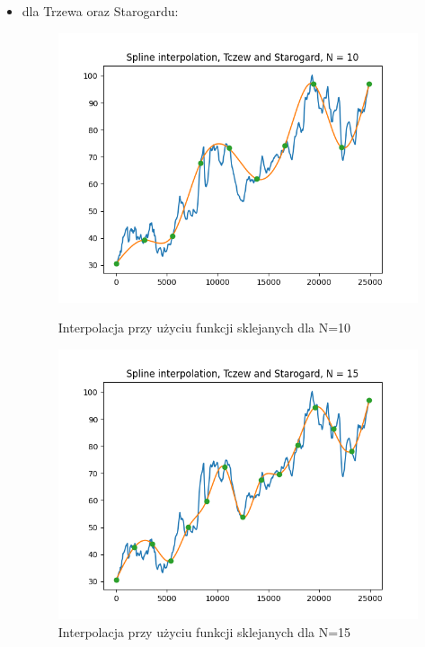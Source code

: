 \documentclass{article}
\begin{document}
\begin{itemize}
    \newpage
    \item dla Trzewa oraz Starogardu:
    \begin{figure}[!htb]
      \includegraphics[width=\linewidth]{Tczew_and_Starogard_splines_N_10.png}
      \caption{Interpolacja przy użyciu funkcji sklejanych dla N=10}
    \endminipage\hfill
      \includegraphics[width=\linewidth]{Tczew_and_Starogard_splines_N_15.png}
      \caption{Interpolacja przy użyciu funkcji sklejanych dla N=15}
    \endminipage\hfill

\end{figure}
\end{itemize}
\end{document}
